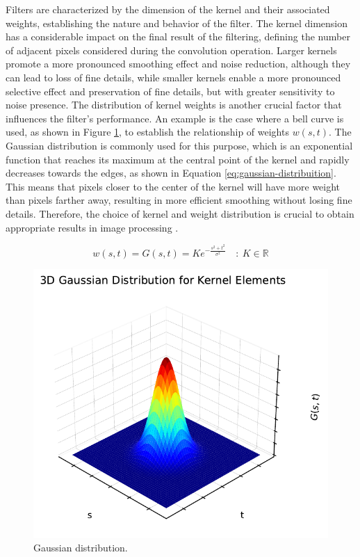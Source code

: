 Filters are characterized by the dimension of the kernel and their associated weights, establishing the nature and behavior of the filter. The kernel dimension has a considerable impact on the final result of the filtering, defining the number of adjacent pixels considered during the convolution operation. Larger kernels promote a more pronounced smoothing effect and noise reduction, although they can lead to loss of fine details, while smaller kernels enable a more pronounced selective effect and preservation of fine details, but with greater sensitivity to noise presence. The distribution of kernel weights is another crucial factor that influences the filter's performance. An example is the case where a bell curve is used, as shown in Figure \ref{fig:gaussian3d}, to establish the relationship of weights $w(s, t)$. The Gaussian distribution is commonly used for this purpose, which is an exponential function that reaches its maximum at the central point of the kernel and rapidly decreases towards the edges, as shown in Equation \ref{eq:gaussian-distribuition}. This means that pixels closer to the center of the kernel will have more weight than pixels farther away, resulting in more efficient smoothing without losing fine details. Therefore, the choice of kernel and weight distribution is crucial to obtain appropriate results in image processing \cite{gonzalez_rafael_c_digital_2018, mcandrew2004introduction, DHAEYER1989}.

\begin{equation}
    w(s,t) = G(s, t) = K e^{-\frac{s^2 + t^2}{\sigma^2}} \quad  :\ K \in \mathbb{R}
    \label{eq:gaussian-distribuition}
\end{equation}

\begin{figure}[h!]
\centering
\includegraphics[width=.65\linewidth]{images/Development/chap3/gaussian_3d_plot.pdf}
\caption{Gaussian distribution.}
\label{fig:gaussian3d}
\end{figure}


